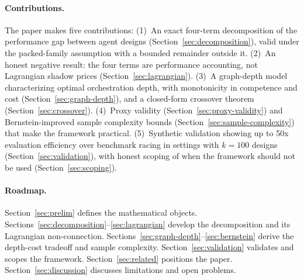 \paragraph{Contributions.}
The paper makes five contributions:
(1)~An exact four-term decomposition of the performance gap between agent designs (Section~\ref{sec:decomposition}), valid under the packed-family assumption with a bounded remainder outside it.
(2)~An honest negative result: the four terms are performance accounting, not Lagrangian shadow prices (Section~\ref{sec:lagrangian}).
(3)~A graph-depth model characterizing optimal orchestration depth, with monotonicity in competence and cost (Section~\ref{sec:graph-depth}), and a closed-form crossover theorem (Section~\ref{sec:crossover}).
(4)~Proxy validity (Section~\ref{sec:proxy-validity}) and Bernstein-improved sample complexity bounds (Section~\ref{sec:sample-complexity}) that make the framework practical.
(5)~Synthetic validation showing up to 50x evaluation efficiency over benchmark racing in settings with $k = 100$ designs (Section~\ref{sec:validation}), with honest scoping of when the framework should not be used (Section~\ref{sec:scoping}).

\paragraph{Roadmap.}
Section~\ref{sec:prelim} defines the mathematical objects.
Sections~\ref{sec:decomposition}--\ref{sec:lagrangian} develop the decomposition and its Lagrangian non-connection.
Sections~\ref{sec:graph-depth}--\ref{sec:bernstein} derive the depth-cost tradeoff and sample complexity.
Section~\ref{sec:validation} validates and scopes the framework.
Section~\ref{sec:related} positions the paper.
Section~\ref{sec:discussion} discusses limitations and open problems.
